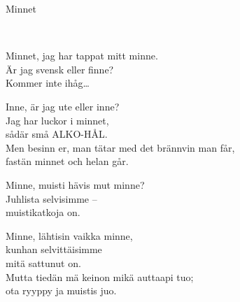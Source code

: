 \begin{song}{Minnet}
	
	
	\\
	
	Minnet, jag har tappat mitt minne.\\
	Är jag svensk eller finne?\\
	Kommer inte ihåg\ldots{}
	
	Inne, är jag ute eller inne?\\
	Jag har luckor i minnet,\\
	sådär små ALKO-HÅL.\\
	Men besinn er, man tätar med det brännvin man får,\\
	fastän minnet och helan går.
	
	Minne, muisti hävis mut minne?\\
	Juhlista selvisimme --\\
	muistikatkoja on.
	
	Minne, lähtisin vaikka minne,\\
	kunhan selvittäisimme\\
	mitä sattunut on.\\
	Mutta tiedän mä keinon mikä auttaapi tuo;\\
	ota ryyppy ja muistis juo.
	
\end{song}
